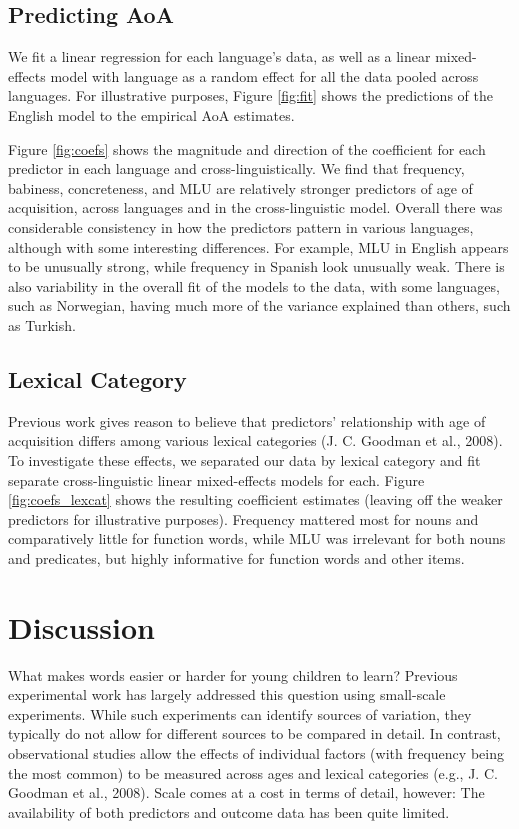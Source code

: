 \documentclass[10pt, letterpaper]{article}
\begin{document}
\subsection{Predicting AoA}\label{predicting-aoa}

We fit a linear regression for each language's data, as well as a linear
mixed-effects model with language as a random effect for all the data
pooled across languages. For illustrative purposes, Figure \ref{fig:fit}
shows the predictions of the English model to the empirical AoA
estimates.

Figure \ref{fig:coefs} shows the magnitude and direction of the
coefficient for each predictor in each language and
cross-linguistically. We find that frequency, babiness, concreteness,
and MLU are relatively stronger predictors of age of acquisition, across
languages and in the cross-linguistic model. Overall there was
considerable consistency in how the predictors pattern in various
languages, although with some interesting differences. For example, MLU
in English appears to be unusually strong, while frequency in Spanish
look unusually weak. There is also variability in the overall fit of the
models to the data, with some languages, such as Norwegian, having much
more of the variance explained than others, such as Turkish.

\subsection{Lexical Category}\label{lexical-category}

Previous work gives reason to believe that predictors' relationship with
age of acquisition differs among various lexical categories (J. C.
Goodman et al., 2008). To investigate these effects, we separated our
data by lexical category and fit separate cross-linguistic linear
mixed-effects models for each. Figure \ref{fig:coefs_lexcat} shows the
resulting coefficient estimates (leaving off the weaker predictors for
illustrative purposes). Frequency mattered most for nouns and
comparatively little for function words, while MLU was irrelevant for
both nouns and predicates, but highly informative for function words and
other items.

\section{Discussion}\label{discussion}

What makes words easier or harder for young children to learn? Previous
experimental work has largely addressed this question using small-scale
experiments. While such experiments can identify sources of variation,
they typically do not allow for different sources to be compared in
detail. In contrast, observational studies allow the effects of
individual factors (with frequency being the most common) to be measured
across ages and lexical categories (e.g., J. C. Goodman et al., 2008).
Scale comes at a cost in terms of detail, however: The availability of
both predictors and outcome data has been quite limited.
\end{document}

